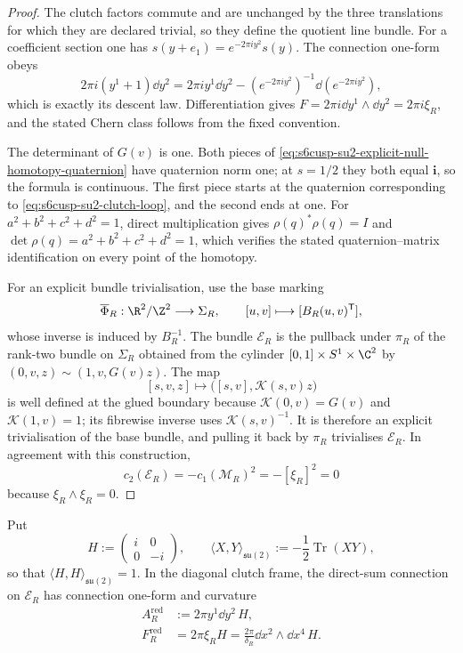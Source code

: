 \begin{proof}
The clutch factors commute and are unchanged by the three translations for
which they are declared trivial, so they define the quotient line bundle.
For a coefficient section one has
\(s(y+e_1)=e^{-2\pi i y^2}s(y)\).  The connection one-form obeys
\[
 2\pi i(y^1+1)\dd y^2
 =2\pi i y^1\dd y^2
 -(e^{-2\pi i y^2})^{-1}\dd(e^{-2\pi i y^2}),
\]
which is exactly its descent law.  Differentiation gives
\(F=2\pi i\dd y^1\wedge\dd y^2=2\pi i\xi_R\), and the stated Chern
class follows from the fixed convention.

The determinant of \(G(v)\) is one.  Both pieces of
\eqref{eq:s6cusp-su2-explicit-null-homotopy-quaternion} have quaternion norm one; at
\(s=1/2\) they both equal \(\mathbf i\), so the formula is continuous.
The first piece starts at the quaternion corresponding to
\eqref{eq:s6cusp-su2-clutch-loop}, and the second ends at one.
For \(a^2+b^2+c^2+d^2=1\), direct multiplication gives
\(\rho(q)^*\rho(q)=I\) and
\(\det\rho(q)=a^2+b^2+c^2+d^2=1\), which verifies the stated
quaternion--matrix identification on every point of the homotopy.

For an explicit bundle trivialisation, use the base marking
\begin{equation}\label{eq:s6cusp-Sigma-marking}
 \overline\Phi_R:\R^2/\Z^2\longrightarrow\Sigma_R,
 \qquad [u,v]\longmapsto[B_R(u,v)^{\mathsf T}],
\end{equation}
whose inverse is induced by \(B_R^{-1}\).  The bundle
\(\mathcal E_R\) is the pullback under \(\pi_R\) of the rank-two bundle
on \(\Sigma_R\) obtained from the cylinder
\([0,1]\times S^1\times\C^2\) by
\((0,v,z)\sim(1,v,G(v)z)\).  The map
\[
 [s,v,z]\longmapsto
 \bigl([s,v],\mathscr K(s,v)z\bigr)
\]
is well defined at the glued boundary because
\(\mathscr K(0,v)=G(v)\) and \(\mathscr K(1,v)=1\); its fibrewise inverse
uses \(\mathscr K(s,v)^{-1}\).  It is therefore an explicit trivialisation
of the base bundle, and pulling it back by \(\pi_R\) trivialises
\(\mathcal E_R\).  In agreement with this construction,
\[
 c_2(\mathcal E_R)
 =-c_1(\mathcal M_R)^2=-[\xi_R]^2=0
\]
because \(\xi_R\wedge\xi_R=0\).
\end{proof}

Put
\begin{equation}\label{eq:s6cusp-su2-Cartan-generator}
 H:=\begin{pmatrix}i&0\\0&-i\end{pmatrix},
 \qquad
 \langle X,Y\rangle_{\mathfrak{su}(2)}
 :=-\frac12\operatorname{Tr}(XY),
\end{equation}
so that \(\langle H,H\rangle_{\mathfrak{su}(2)}=1\).  In the diagonal
clutch frame, the direct-sum connection on \(\mathcal E_R\) has
connection one-form and curvature
\begin{align}
 A_R^{\mathrm{red}}&:=2\pi y^1\dd y^2\,H,
 \label{eq:s6cusp-reducible-connection}\\
 F_R^{\mathrm{red}}
 &=2\pi\xi_R H
 =\frac{2\pi}{\delta_R}\dd x^2\wedge\dd x^4\,H.
 \label{eq:s6cusp-reducible-curvature}
\end{align}

